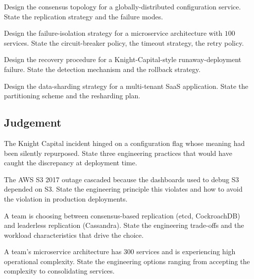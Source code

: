 \begin{exercise}
Design the consensus topology for a globally-distributed configuration service. State the replication strategy and the failure modes.
\end{exercise}

\begin{exercise}
Design the failure-isolation strategy for a microservice architecture with $100$ services. State the circuit-breaker policy, the timeout strategy, the retry policy.
\end{exercise}

\begin{exercise}
Design the recovery procedure for a Knight-Capital-style runaway-deployment failure. State the detection mechanism and the rollback strategy.
\end{exercise}

\begin{exercise}
Design the data-sharding strategy for a multi-tenant SaaS application. State the partitioning scheme and the resharding plan.
\end{exercise}

\subsection*{Judgement}

\begin{exercise}
The Knight Capital incident hinged on a configuration flag whose meaning had been silently repurposed. State three engineering practices that would have caught the discrepancy at deployment time.
\end{exercise}

\begin{exercise}
The AWS S3 2017 outage cascaded because the dashboards used to debug S3 depended on S3. State the engineering principle this violates and how to avoid the violation in production deployments.
\end{exercise}

\begin{exercise}
A team is choosing between consensus-based replication (etcd, CockroachDB) and leaderless replication (Cassandra). State the engineering trade-offs and the workload characteristics that drive the choice.
\end{exercise}

\begin{exercise}
A team's microservice architecture has $300$ services and is experiencing high operational complexity. State the engineering options ranging from accepting the complexity to consolidating services.
\end{exercise}

